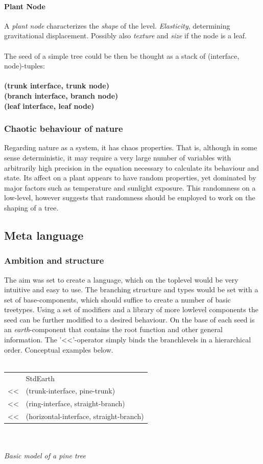 \paragraph{Plant Node}
A \emph{plant node} characterizes the \emph{shape} of the level.
\emph{Elasticity}, determining gravitational displacement. Possibly also
\emph{texture} and \emph{size} if the node is a leaf.

\paragraph{}
The seed of a simple tree could be then be thought as a stack of
(interface, node)-tuples:
\\\\
{\bf (trunk interface, trunk node)\\
(branch interface, branch node)\\
(leaf interface, leaf node)}

\subsubsection{Chaotic behaviour of nature}
Regarding nature as a system, it has chaos properties. That is, although in
some sense deterministic, it may require a very large number of variables
with arbitrarily high precision in the equation necessary to calculate 
its behaviour and state. Its
affect on a plant appears to have random properties, yet dominated by major
factors such as temperature and sunlight exposure. This randomness on a
low-level, however suggests that randomness should be employed to work on the
shaping of a tree.

\subsection{Meta language}
\subsubsection{Ambition and structure}
The aim was set to create a language, which on the toplevel would be very
intuitive and easy to use. The branching structure and types would be set with
a set of base-components, which should suffice to create a number of basic
treetypes. Using a set of modifiers and a library of more lowlevel components
the seed can be further modified to a desired behaviour. On the base of each 
seed is an \emph{earth}-component that contains
the root function and other general information. The '<<'-operator simply
binds the branchlevels in a hierarchical order. Conceptual examples
below. 
\\\\
\begin{tabular}{ll}
  &StdEarth\\
  <<&(trunk-interface, pine-trunk)\\
  <<&(ring-interface, straight-branch)\\
  <<&(horizontal-interface, straight-branch)\\ 
\end{tabular}
\\\\
\emph{Basic model of a pine tree}\\

